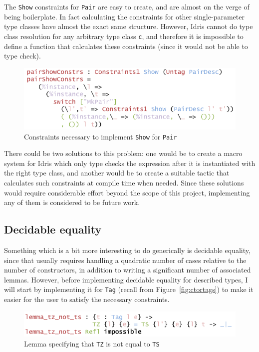 \documentclass{ituthesis}
\newcommand{\ttconstructor}[1]{\textcolor{constructor-color}{\texttt{#1}}}
\newcommand{\tttype}[1]{\textcolor{type-color}{\texttt{#1}}}
\newcommand{\ttdec}[1]{\textcolor{declared-var-color}{\texttt{#1}}}
\newcommand{\ttvar}[1]{\textcolor{local-var-color}{\texttt{#1}}}
\theoremstyle{break}
\begin{document}
The \tttype{Show} constraints for \ttdec{Pair} are easy to create, and are almost on the verge of being boilerplate.
In fact calculating the constraints for other single-parameter type classes have almost the exact same structure.
However, Idris cannot do type class resolution for any arbitrary type class \ttvar{c}, and therefore it is impossible to define a function that calculates these constraints (since it would not be able to type check).

\begin{figure}[ht]
\begin{center}
    \includegraphics[scale=0.5]{Figures/GenericShowConstraints.png}
\end{center}
\caption{Constraints necessary to implement \tttype{Show} for \ttdec{Pair}}
\label{fig:showconstrs}
\end{figure}

There could be two solutions to this problem: one would be to create a macro system for Idris which only type checks the expression after it is instantiated with the right type class, and another
would be to create a suitable tactic that calculates such constraints at compile time when needed.
Since these solutions would require considerable effort beyond the scope of this project, implementing any of them is considered to be future work.


\subsection{Decidable equality}
\label{sub:Decidable equality}
Something which is a bit more interesting to do generically is decidable equality, since that usually
requires handling a quadratic number of cases relative to the number of constructors, in addition to writing a significant number of associated lemmas.
However, before implementing decidable equality for described types, I will start by implementing it for \tttype{Tag} (recall from Figure~\ref{fig:ctortags}) to make it easier for the user to satisfy
the necessary constraints.

\begin{figure}[ht]
\begin{center}
    \includegraphics[scale=0.5]{Figures/TagDecEqLemma1.png}
\end{center}
\caption{Lemma specifying that \ttconstructor{TZ} is not equal to \ttconstructor{TS}}
\label{fig:taglem1}
\end{figure}
\end{document}
